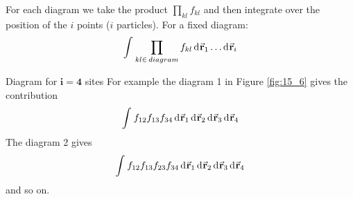 \documentclass[../main/main.tex]{subfiles}
\begin{document}
For each diagram we take the product \( \prod_{kl}^{} f_{kl}   \) and then integrate over the position of the \( i \) points (\( i \) particles). For a fixed diagram:
\begin{equation*}
  \int_{}^{} \prod_{kl \in \, diagram }^{} f_{kl} \dd[]{\va{r}_1} \dots \dd[]{\va{r}_i}
\end{equation*}

\begin{example}{Diagram for \( \pmb{i=4} \) sites}{}
  For example the diagram 1 in Figure \ref{fig:15_6} gives the contribution
  \begin{equation*}
    \int_{}^{} f_{12} f_{13} f_{34} \dd[]{\va{r}_1}  \dd[]{\va{r}_2} \dd[]{\va{r}_3} \dd[]{\va{r}_4}
  \end{equation*}
  The diagram 2 gives
  \begin{equation*}
    \int_{}^{} f_{12} f_{13} f_{23} f_{34} \dd[]{\va{r}_1}  \dd[]{\va{r}_2} \dd[]{\va{r}_3} \dd[]{\va{r}_4}
  \end{equation*}
  and so on.
\end{example}
\end{document}
